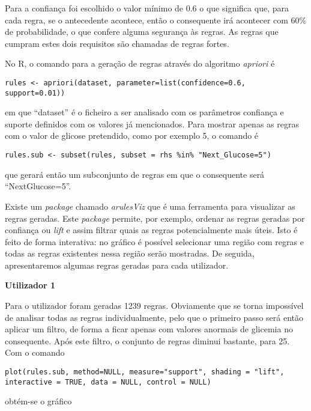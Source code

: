 Para a confiança foi escolhido o valor mínimo de 0.6 o que significa que, para cada regra, se o antecedente acontece, então o consequente irá acontecer com 60\% de probabilidade, o que confere alguma segurança às regras. As regras que cumpram estes dois requisitos são chamadas de regras fortes.


No R, o comando para a geração de regras através do algoritmo \textit{apriori} é

\begin{lstlisting}
rules <- apriori(dataset, parameter=list(confidence=0.6, support=0.01))
\end{lstlisting}

em que ``dataset'' é o ficheiro a ser analisado com os parâmetros confiança e suporte definidos com os valores já mencionados. Para mostrar apenas as regras com o valor de glicose pretendido, como por exemplo 5, o comando é

\begin{lstlisting}
rules.sub <- subset(rules, subset = rhs %in% "Next_Glucose=5")
\end{lstlisting}

que gerará então um subconjunto de regras em que o consequente será ``Next\textunderscore Glucose=5''.

Existe um \textit{package} chamado \textit{arulesViz} que é uma ferramenta para visualizar as regras geradas. Este \textit{package} permite, por exemplo, ordenar as regras geradas por confiança ou \textit{lift} e assim filtrar quais as regras potencialmente mais úteis. Isto é feito de forma interativa: no gráfico é possível selecionar uma região com regras e todas as regras existentes nessa região serão mostradas.
De seguida, apresentaremos algumas regras geradas para cada utilizador.

\textbf{Utilizador 1}

Para o utilizador foram geradas 1239 regras. Obviamente que se torna impossível de analisar todas as regras individualmente, pelo que o primeiro passo será então aplicar um filtro, de forma a ficar apenas com valores anormais de glicemia no consequente. Após este filtro, o conjunto de regras diminui bastante, para 25. Com o comando

\begin{lstlisting}
plot(rules.sub, method=NULL, measure="support", shading = "lift", interactive = TRUE, data = NULL, control = NULL)
\end{lstlisting}

obtém-se o gráfico

